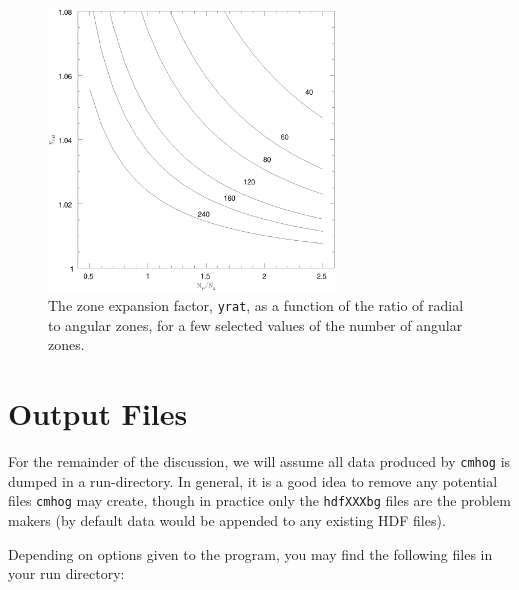 \documentclass[10pt,dvips]{article}
\begin{document}
\begin{figure}[htbp]
\centering
\includegraphics[width=3in]{yrat.ps}
\caption{The zone expansion factor, {\tt yrat}, as a function of
the ratio of radial to angular zones, for a few selected values
of the number of angular zones.
}
\end{figure}


\section{Output Files}

For the remainder of the discussion, we will assume all data produced
by {\tt cmhog} is dumped in a run-directory. In general, it is a good
idea to remove any potential files {\tt cmhog} may create, though
in practice only the {\tt hdfXXXbg} files are the problem makers
(by default data would be appended to any existing HDF files).

Depending on options given to the program, you may find the following files
in your run directory:
\end{document}
